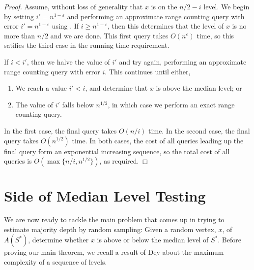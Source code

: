 \documentclass{cccg12}
\newcommand{\eps}{\varepsilon}
\begin{document}
\begin{proof}
  Assume, without loss of generality that $x$ is on the $n/2-i$
  level.  We begin by setting $i'= n^{1-\eps}$ and performing
  an approximate range counting query with error $i'=n^{1-\eps}$
  using .  If $i \ge n^{1-\eps}$, then this
  determines that the level of $x$ is no more than $n/2$ and we are done.
  This first query takes $O(n^{\eps})$ time, so this satifies the
  third case in the running time requirement.

  If $i < i'$, then we halve the value of $i'$ and try again, performing
  an approximate range counting query with error $i$.  This continues
  until either,
  \begin{enumerate}
    \item We reach a value $i' < i$, and determine that $x$ is above the
      median level; or
    \item The value of $i'$ falls below $n^{1/2}$, in which case we perform
      an exact range counting query.
  \end{enumerate}
  In the first case, the final query takes $O(n/i)$ time. In the second
  case, the final query takes $O(n^{1/2})$ time.  In both cases, the cost
  of all queries leading up the final query form an exponential increasing
  sequence, so the total cost of all queries is $O(\max\{n/i,n^{1/2}\})$,
  as required.
\end{proof}


\section{Side of Median Level Testing}

We are now ready to tackle the main problem that comes up in trying to
estimate majority depth by random sampling:  Given a random vertex,
$x$, of $A(S^*)$, determine whether $x$ is above or below the median
level of $S^*$.  Before proving our main theorem, we recall a result of
Dey \cite[Theorem~4.2]{d98} about the maximum complexity of a sequence
of levels.
\end{document}
